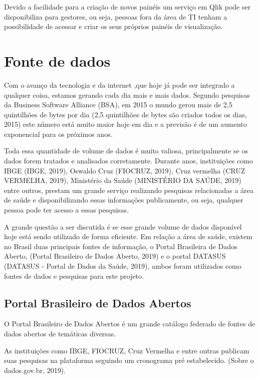 \documentclass[
	12pt,				%
	openright,			%
	oneside,			%
	a4paper,			%
	chapter=TITLE,		%
	section=TITLE,		%
	subsection=TITLE,	%
	subsubsection=TITLE,%
	english,			%
	brazil				%
	]{abntex2}
\theoremstyle{definition}
\begin{document}
    Devido a facilidade para a criação de novos painéis um serviço em Qlik pode ser disponibiliza para gestores, ou seja, pessoas fora da área de TI tenham a possibilidade de acessar e criar os seus próprios painéis de visualização. 
    
\section{Fonte de dados}
    
    Com o avanço da tecnologia e da internet ,que hoje já pode ser integrado a qualquer coisa, estamos gerando cada dia mais e mais dados. Segundo pesquisas da Business Software Alliance (BSA), em 2015 o mundo gerou mais de 2,5 quintilhões de bytes por dia (2,5 quintilhões de bytes são criados todos os dias, 2015) este número está muito maior hoje em dia e a previsão é de um aumento exponencial para os próximos anos. 
    
    Toda essa quantidade de volume de dados é muito valiosa, principalmente se os dados forem tratados e analisados corretamente. Durante anos, instituições como IBGE (IBGE, 2019), Oswaldo Cruz (FIOCRUZ, 2019), Cruz vermelha (CRUZ VERMELHA, 2019), Ministério da Saúde (MINISTÉRIO DA SAÚDE, 2019) entre outros, prestam um grande serviço realizando pesquisas relacionadas a área de saúde e disponibilizando essas informações publicamente, ou seja, qualquer pessoa pode ter acesso a essas pesquisas. 
     
     A grande questão a ser discutida é se esse grande volume de dados disponível hoje está sendo utilizado de forma eficiente. Em relação a área de saúde, existem no Brasil duas principais fontes de informação, o Portal Brasileira de Dados Aberto, (Portal Brasileiro de Dados Aberto, 2019) e o portal DATASUS (DATASUS - Portal de Dados da Saúde, 2019), ambos foram utilizados como fontes de dados e pesquisas para este projeto.
    
\subsection{Portal Brasileiro de Dados Abertos}
   
    O Portal Brasileiro de Dados Abertos é um grande catálogo federado de fontes de dados abertos de temáticas diversas. 
    
    As instituições como IBGE, FIOCRUZ, Cruz Vermelha e entre outras publicam suas pesquisas na plataforma seguindo um cronograma pré estabelecido. (Sobre o dados.gov.br, 2019).
    
\end{document}
